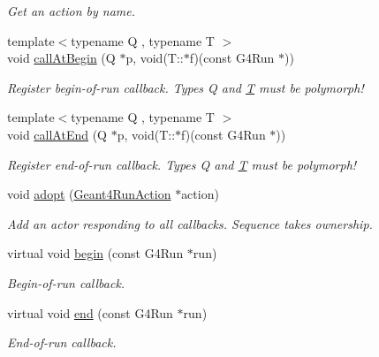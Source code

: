 \begin{DoxyCompactItemize}
\begin{DoxyCompactList}\small\item\em Get an action by name. \end{DoxyCompactList}\item 
{\footnotesize template$<$typename Q , typename T $>$ }\\void \hyperlink{class_d_d4hep_1_1_simulation_1_1_geant4_run_action_sequence_ab5204f4d44dc2a25a21ad29fcfc30a24}{call\+At\+Begin} (Q $\ast$p, void(T\+::$\ast$f)(const G4\+Run $\ast$))
\begin{DoxyCompactList}\small\item\em Register begin-\/of-\/run callback. Types Q and \hyperlink{class_t}{T} must be polymorph! \end{DoxyCompactList}\item 
{\footnotesize template$<$typename Q , typename T $>$ }\\void \hyperlink{class_d_d4hep_1_1_simulation_1_1_geant4_run_action_sequence_a91c572acf97c51edd3e4a7e296064a49}{call\+At\+End} (Q $\ast$p, void(T\+::$\ast$f)(const G4\+Run $\ast$))
\begin{DoxyCompactList}\small\item\em Register end-\/of-\/run callback. Types Q and \hyperlink{class_t}{T} must be polymorph! \end{DoxyCompactList}\item 
void \hyperlink{class_d_d4hep_1_1_simulation_1_1_geant4_run_action_sequence_a9daef9eac6020138426b08116710ceaf}{adopt} (\hyperlink{class_d_d4hep_1_1_simulation_1_1_geant4_run_action}{Geant4\+Run\+Action} $\ast$action)
\begin{DoxyCompactList}\small\item\em Add an actor responding to all callbacks. Sequence takes ownership. \end{DoxyCompactList}\item 
virtual void \hyperlink{class_d_d4hep_1_1_simulation_1_1_geant4_run_action_sequence_a447a8f86614e2a958dcc0761ce89344b}{begin} (const G4\+Run $\ast$run)
\begin{DoxyCompactList}\small\item\em Begin-\/of-\/run callback. \end{DoxyCompactList}\item 
virtual void \hyperlink{class_d_d4hep_1_1_simulation_1_1_geant4_run_action_sequence_a2a21cad772d05ac39502c35e334c6e5f}{end} (const G4\+Run $\ast$run)
\begin{DoxyCompactList}\small\item\em End-\/of-\/run callback. \end{DoxyCompactList}\end{DoxyCompactItemize}
